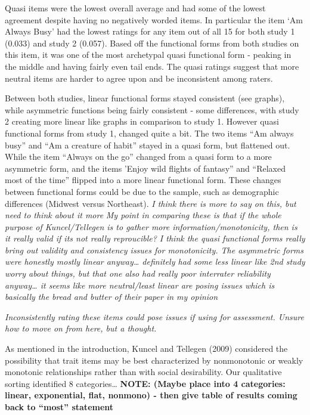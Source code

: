 \documentclass[
  ,jou]{apa6}
\begin{document}
Quasi items were the lowest overall average and had some of the lowest agreement despite having no negatively worded items. In particular the item `Am Always Busy' had the lowest ratings for any item out of all 15 for both study 1 (0.033) and study 2 (0.057). Based off the functional forms from both studies on this item, it was one of the most archetypal quasi functional form - peaking in the middle and having fairly even tail ends. The quasi ratings suggest that more neutral items are harder to agree upon and be inconsistent among raters.

Between both studies, linear functional forms stayed consistent (see graphs), while asymmetric functions being fairly consistent - some differences, with study 2 creating more linear like graphs in comparison to study 1. However quasi functional forms from study 1, changed quite a bit. The two items ``Am always busy'' and ``Am a creature of habit'' stayed in a quasi form, but flattened out. While the item ``Always on the go'' changed from a quasi form to a more asymmetric form, and the items 'Enjoy wild flights of fantasy'' and ``Relaxed most of the time'' flipped into a more linear functional form. These changes between functional forms could be due to the sample, such as demographic differences (Midwest versus Northeast). \emph{I think there is more to say on this, but need to think about it more} \emph{My point in comparing these is that if the whole purpose of Kuncel/Tellegen is to gather more information/monotonicity, then is it really valid if its not really reproucible? I think the quasi functional forms really bring out validity and consistency issues for monotonicity. The asymmetric forms were honestly mostly linear anyway\ldots{} definitely had some less linear like 2nd study worry about things, but that one also had really poor interrater reliability anyway\ldots{} it seems like more neutral/least linear are posing issues which is basically the bread and butter of their paper in my opinion}

\emph{Inconsistently rating these items could pose issues if using for assessment. Unsure how to move on from here, but a thought.}

As mentioned in the introduction, Kuncel and Tellegen (2009) considered the possibility that trait items may be best characterized by nonmonotonic or weakly monotonic relationships rather than with social desirability. Our qualitative sorting identified 8 categories\ldots{} \textbf{NOTE: (Maybe place into 4 categories: linear, exponential, flat, nonmono) - then give table of results coming back to ``most'' statement}
\end{document}
